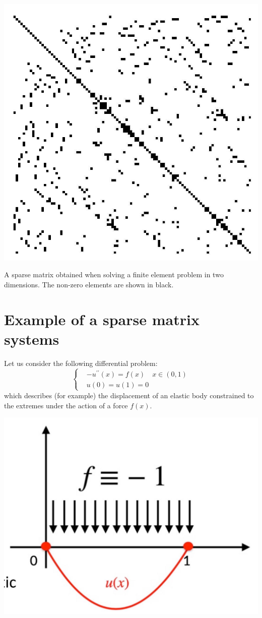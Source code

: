 \documentclass[11pt]{book}
\begin{document}
\begin{center}
\includegraphics[scale = 0.22,max width=\textwidth]{2023_09_05_b72ccc85584d9dc6fb5cg-030}
\end{center}
A sparse matrix obtained when solving a finite element problem in two dimensions. The non-zero elements are shown in black.
\section*{Example of a sparse matrix systems}
Let us consider the following differential problem:
$$
\begin{cases}
& -u^{\prime \prime}(x)=f(x) \quad x \in(0,1) \\
& u(0)=u(1)=0
\end{cases}
$$
which describes (for example) the displacement of an elastic body constrained to the extremes under the action of a force $f(x)$.
\begin{center}
\includegraphics[scale = 0.2,max width=\textwidth]{2023_09_05_b72ccc85584d9dc6fb5cg-032(1)}
\end{center}
\end{document}
